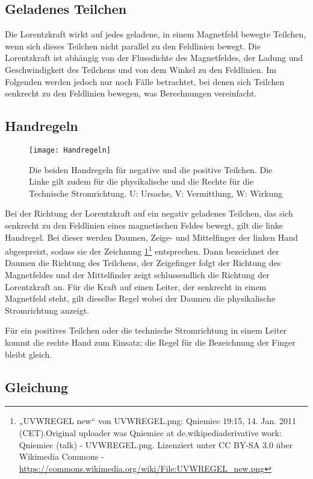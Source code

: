 \subsection{Geladenes Teilchen}

Die Lorentzkraft wirkt auf jedes geladene, in einem Magnetfeld bewegte Teilchen, wenn sich dieses Teilchen nicht parallel zu den Feldlinien bewegt. Die Lorentzkraft ist abhängig von der Flussdichte des Magnetfeldes, der Ladung und Geschwindigkeit des Teilchens und von dem Winkel zu den Feldlinien. Im Folgenden werden jedoch nur noch Fälle betrachtet, bei denen sich Teilchen senkrecht zu den Feldlinien bewegen, was Berechnungen vereinfacht.

\subsection{Handregeln} \label{subsec:handregeln}

\begin{figure}[h!]
	\centering
	\texttt{[image: Handregeln]}
	\caption{Die beiden Handregeln für negative und die positive Teilchen. Die Linke gilt zudem für die physikalische und die Rechte für die Technische Stromrichtung. U: Ursache, V: Vermittlung, W: Wirkung}
	\label{fig:Handregeln}
\end{figure}

Bei der Richtung der Lorentzkraft auf ein negativ geladenes Teilchen, das sich senkrecht zu den Feldlinien eines magnetischen Feldes bewegt, gilt die linke Handregel. Bei dieser werden Daumen, Zeige- und Mittelfinger der linken Hand abgespreizt, sodass sie der Zeichnung \ref{fig:Handregeln}\footnote{„UVWREGEL new“ von UVWREGEL.png: Qniemiec 19:15, 14. Jan. 2011 (CET).Original uploader was Qniemiec at de.wikipediaderivative work: Qniemiec (talk) - UVWREGEL.png. Lizenziert unter CC BY-SA 3.0 über Wikimedia Commons - \url{https://commons.wikimedia.org/wiki/File:UVWREGEL_new.png}} entsprechen. Dann bezeichnet der Daumen die Richtung des Teilchens, der Zeigefinger folgt der Richtung des Magnetfeldes und der Mittelfinder zeigt schlussendlich die Richtung der Lorentzkraft an. Für die Kraft auf einen Leiter, der senkrecht in einem Magnetfeld steht, gilt dieselbe Regel wobei der Daumen die physikalische Stromrichtung anzeigt.

Für ein positives Teilchen oder die technische Stromrichtung in einem Leiter kommt die rechte Hand zum Einsatz; die Regel für die Bezeichnung der Finger bleibt gleich.


\subsection{Gleichung} \label{subsec:BLorentzDefinition}

